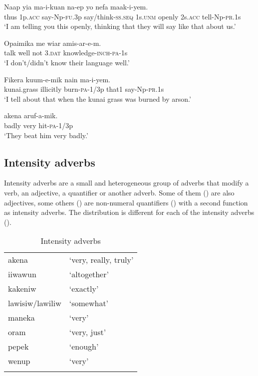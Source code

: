 \ea%
\label{ex:3:x704}
\gll Naap yia ma-i-kuan na-ep yo  nefa maak-i-yem.\\
thus 1p.\textsc{acc} say-Np-\textsc{fu}.3p say/think-\textsc{ss}.\textsc{seq} 1s.\textsc{unm} openly 2s.\textsc{acc} tell-Np-\textsc{pr}.1s\\
\glt`I am telling you this openly, thinking that they will say like that about us.'
\z

\ea%
\label{ex:3:x505}
\gll Opaimika  me wiar amis-ar-e-m. \\
talk well not 3.\textsc{dat} knowledge-\textsc{inch}-\textsc{pa}-1s\\
\glt`I don't/didn't know their language well.'
\z

\ea%
\label{ex:3:x507}
\gll Fikera  kuum-e-mik nain ma-i-yem. \\
kunai.grass illicitly burn-\textsc{pa}-1/3p that1 say-Np-\textsc{pr}.1s\\
\glt`I tell about that when the kunai grass was burned by arson.'
\z

\ea%
\label{ex:3:x506}
\gll {} akena aruf-a-mik. \\
badly very hit-\textsc{pa}-1/3p\\
\glt`They beat him very badly.'
\z

\subsection{Intensity adverbs}\label{sec:3:y:x}
{}
Intensity adverbs are a small and heterogeneous group of adverbs that modify a verb, an adjective, a quantifier or another adverb. Some of them () are also adjectives, some others () are non-numeral quantifiers () with a second function as intensity adverbs. The distribution is different for each of the intensity adverbs ().

\begin{table}
\begin{tabular}{ll}
\mytoprule
akena &`very, really, truly'\\
iiwawun &`altogether'\\
kakeniw &`exactly'\\
lawisiw/lawiliw &`somewhat'\\
maneka &`very'\\
oram &`very, just'\\
pepek &`enough'\\
wenup &`very'\\
\mybottomrule 
\end{tabular}
\caption{Intensity adverbs}
\label{tab:3:intensityadverbs}
\end{table}

